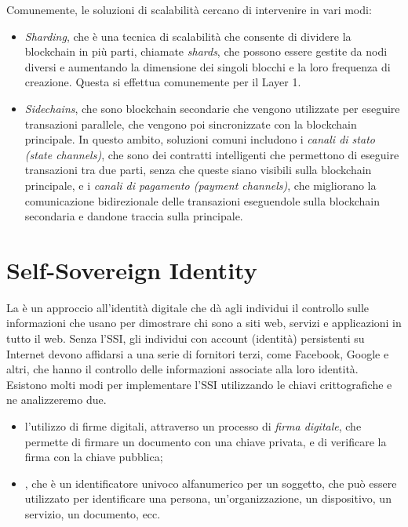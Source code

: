 Comunemente, le soluzioni di scalabilità cercano di intervenire in vari modi:
\begin{itemize}
    \item{\textit{Sharding}}, che è una tecnica di scalabilità che consente di dividere la blockchain in più parti, chiamate \textit{shards}, che possono essere gestite da nodi diversi e aumentando
    la dimensione dei singoli blocchi e la loro frequenza di creazione. Questa si effettua comunemente per il Layer 1.
    \item{\textit{Sidechains}}, che sono blockchain secondarie che vengono utilizzate per eseguire transazioni parallele, che vengono poi sincronizzate con la blockchain principale.
    In questo ambito, soluzioni comuni includono i \textit{canali di stato (state channels)}, che sono dei contratti intelligenti che permettono di eseguire transazioni tra due parti, senza che queste siano visibili sulla blockchain principale,
    e i \textit{canali di pagamento (payment channels)}, che migliorano la comunicazione bidirezionale delle transazioni eseguendole sulla blockchain secondaria e dandone traccia sulla principale.
\end{itemize}

\section{Self-Sovereign Identity}\label{sec:self-sovereign-identity}

La  è un approccio all'identità digitale che dà agli individui 
il controllo sulle informazioni che usano per dimostrare chi sono a siti web, servizi e applicazioni in tutto il web. 
Senza l'SSI, gli individui con account (identità) persistenti su Internet devono affidarsi a una serie di fornitori terzi, come Facebook, Google e altri,
che hanno il controllo delle informazioni associate alla loro identità. \\

Esistono molti modi per implementare l'SSI utilizzando le chiavi crittografiche e ne analizzeremo due.
\begin{itemize}
    \item l'utilizzo di firme digitali, attraverso un processo di \textit{firma digitale}, che permette di firmare un documento con una chiave privata, e di verificare la firma con la chiave pubblica;
    \item {}, che è un identificatore univoco alfanumerico per un soggetto, che può essere utilizzato per identificare una persona, un'organizzazione, un dispositivo, un servizio, un documento, ecc.
\end{itemize}  

